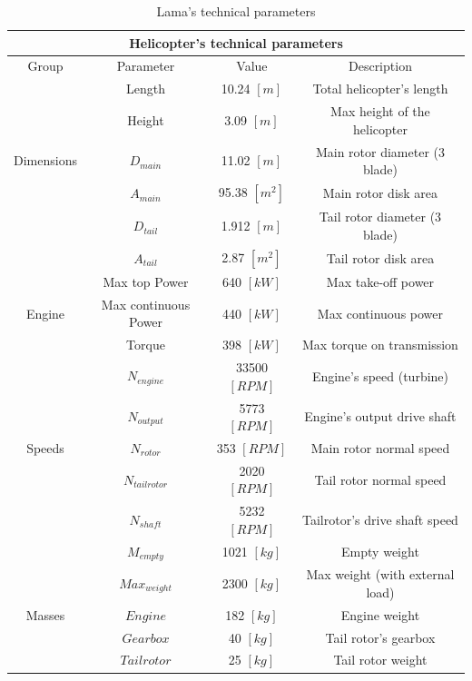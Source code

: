 \smallskip
\begin{table}[h!]
	\centering
	
	\begin{tabular}{c c c c} 
		\toprule
		\multicolumn{4}{c}{Helicopter's technical parameters}\\
		\midrule
		Group & Parameter & Value & Description \\
		\midrule
		 & Length & 10.24 $[m]$  & Total helicopter's length \\
		 & Height & 3.09 $[m]$  & Max height of the helicopter \\ 
		Dimensions & $D_{main}$ & 11.02 $[m]$  & Main rotor diameter (3 blade) \\ 
		 & $A_{main}$ & 95.38 $[m^2]$ & Main rotor disk area \\  
		 & $D_{tail}$ &  1.912 $[m]$ & Tail rotor diameter (3 blade) \\ 
		 & $A_{tail}$ & 2.87 $[m^2]$ & Tail rotor disk area \\  
		 
		 
		 \midrule
		 & Max top Power & 640 $[kW]$  & Max take-off power \\
		 Engine & Max continuous Power & 440 $[kW]$  & Max continuous power \\ 
		 & Torque & 398 $[kW]$  & Max torque on transmission \\  
		
		\midrule
		
		 & $N_{engine}$ &  33500 $[RPM]$ & Engine's speed (turbine) \\
		 & $N_{output}$ &  5773 $[RPM]$ & Engine's output drive shaft \\ 
		 Speeds & $N_{rotor}$ &  353 $[RPM]$ & Main rotor normal speed \\
		 & $N_{tailrotor}$  &  2020 $[RPM]$ & Tail rotor normal speed \\ 
		 & $N_{shaft}$ &  5232 $[RPM]$ & Tailrotor's drive shaft speed \\ 
		 
			
		
		\midrule
		& $M_{empty}$ & 1021 $[kg]$  & Empty weight \\
		& $Max_{weight}$ & 2300 $[kg]$  & Max weight (with external load) \\ 
		Masses & $Engine$ & 182 $[kg]$  & Engine weight \\ 
		& $Gearbox$ & 40 $[kg]$ & Tail rotor's gearbox \\  
		& $Tail rotor$ &  25 $[kg]$ & Tail rotor weight \\  
		
		
		
		\bottomrule
	\end{tabular}
	\caption{Lama's technical parameters}
	\label{data}
	
\end{table}











